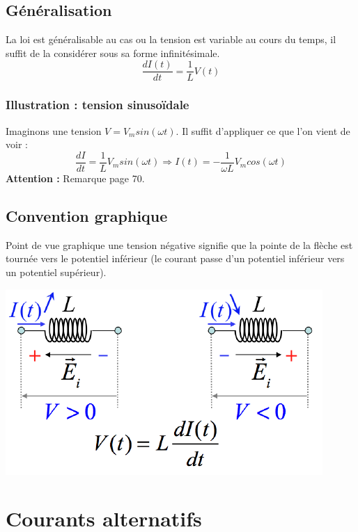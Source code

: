 \documentclass	[11pt, a4paper, openany]{book}
\begin{document}
\subsection{Généralisation}
La loi est généralisable au cas ou la tension est variable au cours du temps, il suffit de la considérer sous sa forme infinitésimale.
\begin{equation}
\frac{dI(t)}{dt} = \frac{1}{L}V(t)
\end{equation}

\subsubsection*{Illustration : tension sinusoïdale}
Imaginons une tension $V = V_m sin(\omega t)$. Il suffit d'appliquer ce que l'on vient de voir : 
\begin{equation}
\frac{dI}{dt} = \frac{1}{L}V_m sin(\omega t) \Rightarrow I(t) = -\frac{1}{\omega L}V_m cos(\omega t)
\end{equation}
\textbf{Attention :} Remarque page 70.
\subsection{Convention graphique}
Point
de vue graphique une tension négative signifie que la pointe de la flèche est tournée
vers le potentiel inférieur (le courant passe d’un potentiel inférieur vers un potentiel
supérieur).

\begin{center}
\includegraphics[scale=0.45]{em/image24.png}\\
\end{center}

\section{Courants alternatifs}
\end{document}
